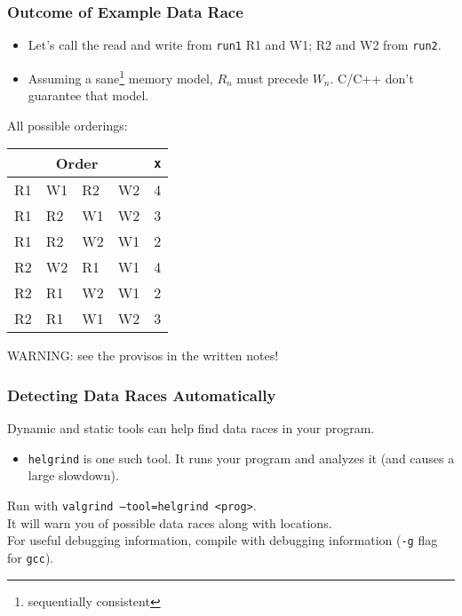 \documentclass[aspectratio=43]{beamer}
\newenvironment{changemargin}[1]{%
  \begin{list}{}{%
    \setlength{\topsep}{0pt}%
    \setlength{\leftmargin}{#1}%
    \setlength{\rightmargin}{1em}
    \setlength{\listparindent}{\parindent}%
    \setlength{\itemindent}{\parindent}%
    \setlength{\parsep}{\parskip}%
  }%
  \item[]}{\end{list}}
\begin{document}
\begin{frame}
  \frametitle{Outcome of Example Data Race}

  \begin{changemargin}{2cm}
  \begin{itemize}
    \item Let's call the read and write from {\tt run1} R1 and W1; R2 and W2
      from {\tt run2}.
    \item Assuming a sane\footnote{sequentially consistent} memory model, $R_n$ must precede $W_n$. \alert{C/C++ don't guarantee that model.}
  \end{itemize}
  \vfill
  All possible orderings:
  \begin{center}
    \begin{tabular}{llll|l}
\multicolumn{4}{c|}{Order} & {\tt *x}\\
\hline
R1 & W1 & R2 & W2 & 4 \\
R1 & R2 & W1 & W2 & 3 \\
R1 & R2 & W2 & W1 & 2 \\
R2 & W2 & R1 & W1 & 4 \\
R2 & R1 & W2 & W1 & 2 \\
R2 & R1 & W1 & W2 & 3 \\
    \end{tabular}
  \end{center}
  \alert{WARNING: see the provisos in the written notes!}
  \end{changemargin}

\end{frame}

\begin{frame}
  \frametitle{Detecting Data Races Automatically}  

  \begin{changemargin}{2.5cm}
    Dynamic and static tools can help find data races in your program.
  \begin{itemize}
    \item {\tt helgrind} is one such tool. It runs your program 
      and analyzes it (and causes a large slowdown).
  \end{itemize}
    Run with {\tt valgrind --tool=helgrind <prog>}.\\[1em]
    It will warn you of possible data races along with locations.\\[1em]
    For useful debugging information, compile with debugging information
      ({\tt -g} flag for {\tt gcc}).
  \end{changemargin}
\end{frame}
\end{document}

